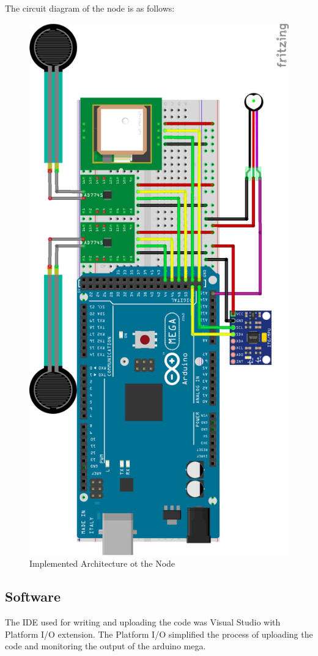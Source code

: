 		The circuit diagram of the node is as follows:

		\begin{figure}[h]
			\centering
			\includegraphics[width=0.8\linewidth]{gfx/node_diagram}
			\caption{Implemented Architecture ot the Node}
			\label{fig:architecture_node}
		\end{figure}

	\subsection{Software}
		The IDE used for writing and uploading the code was Visual Studio with Platform I/O extension. The Platform I/O simplified the process of uploading the code and monitoring the output of the arduino mega.

